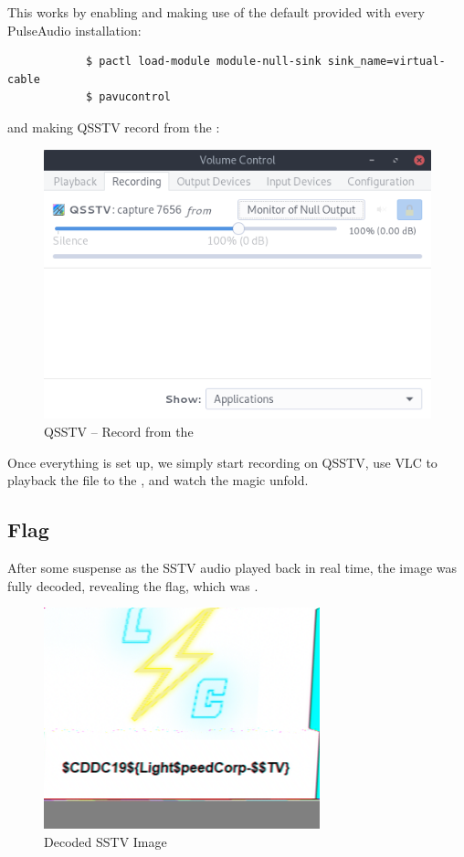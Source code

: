 		\pagebreak
		This works by enabling and making use of the default  provided with every PulseAudio installation:

		\begin{verbatim}
			$ pactl load-module module-null-sink sink_name=virtual-cable
			$ pavucontrol
		\end{verbatim}

		and making QSSTV record from the :

		\begin{figure}[!htbp]
			\centering
			\includegraphics[width=130mm]{figures/sstv/pavu.png} \vspace{5mm}
			\caption{QSSTV -- Record from the }
		\end{figure}

		Once everything is set up, we simply start recording on QSSTV, use VLC to playback the  file to the , and watch
		the magic unfold.

	\pagebreak
	\subsection{Flag}
		After some suspense as the SSTV audio played back in real time, the image was fully decoded, revealing the flag, which
		was .

		\begin{figure}[!htbp]\centering
			\includegraphics[width=80mm]{figures/sstv/SSTV.png} \vspace{5mm}
			\caption{Decoded SSTV Image}
		\end{figure}












